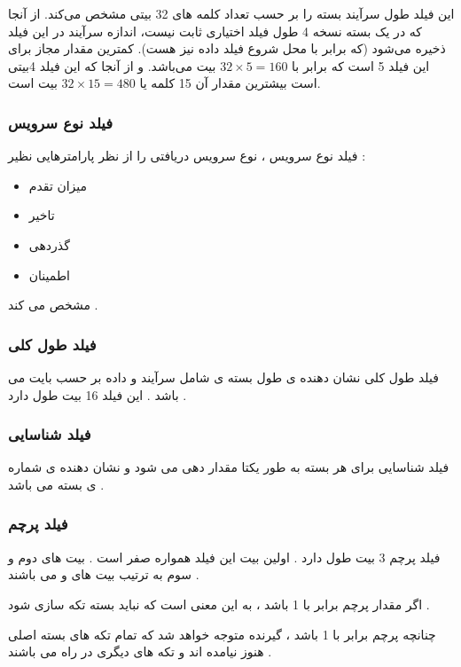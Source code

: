\documentclass[12pt]{book}
\begin{document}
این فیلد طول سرآیند بسته را بر حسب تعداد کلمه های 32 بیتی مشخص می‌کند. از آنجا که در یک بسته 
نسخه 4 طول فیلد اختیاری ثابت نیست، اندازه سرآیند در این فیلد ذخیره می‌شود (که برابر با محل شروع فیلد داده نیز هست). کمترین مقدار مجاز برای این فیلد 5 است 
که برابر با
 $32\times5=160$ 
 بیت می‌باشد. و از آنجا که این فیلد 4بیتی است بیشترین مقدار آن 15 کلمه یا
$32\times15= 480$
  بیت است.



\subsubsection{فیلد نوع سرویس}

فیلد نوع سرویس ، نوع سرویس دریافتی را از نظر پارامترهایی نظیر :

\begin{itemize}
	\item میزان تقدم
	\item تاخیر
	\item گذردهی
	\item اطمینان
\end{itemize}
مشخص می کند .


\subsubsection{فیلد طول کلی}

فیلد طول کلی نشان دهنده ی طول بسته ی 
شامل سرآیند
و داده بر حسب بایت می باشد .
این فیلد 16 بیت طول دارد .


\subsubsection{فیلد شناسایی}

فیلد شناسایی برای هر بسته به طور یکتا مقدار دهی می شود و نشان دهنده ی شماره ی بسته می باشد .

\subsubsection{فیلد پرچم}

فیلد پرچم 3 بیت طول دارد . اولین بیت این فیلد همواره صفر است . بیت های دوم و سوم به ترتیب بیت های
و
می باشند .

اگر مقدار پرچم
برابر با 1 باشد ، به این معنی است که نباید بسته تکه سازی شود .

چنانچه پرچم 
برابر با 1 باشد ، گیرنده متوجه خواهد شد که تمام تکه های بسته اصلی هنوز نیامده اند و تکه های دیگری در راه می باشند .
\end{document}
